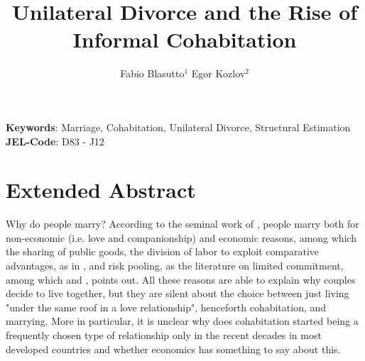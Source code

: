 \documentclass[12pt]{article}
\title{Unilateral Divorce and the Rise of Informal Cohabitation}
\author{Fabio Blasutto$^1$ \quad Egor Kozlov$^2$}
\numberwithin{table}{section}
\begin{document}
	
	
	\maketitle
	

	
	
\textbf{Keywords}: Marriage, Cohabitation, Unilateral Divorce, Structural Estimation\\
\textbf{JEL-Code}: D83 - J12
	
\section{Extended Abstract}
Why do people marry? According to the seminal work of \citet{becker1981}, people marry both for non-economic (i.e. love and companionship) and economic reasons, among which the sharing of public goods, the division of labor to exploit comparative advantages, as in \cite{chiappori1997}, and risk pooling, as the literature on limited commitment, among which \cite{voena2015} and \cite{rigas2015}, points out.
All these reasons are able to explain why couples decide to live together, but they are silent about the choice between just living "under the same roof in a love relationship", henceforth cohabitation, and marrying. More in particular, it is unclear why does cohabitation started being a frequently chosen type of relationship only in the recent decades in most developed countries and whether economics has something to say about this.
\end{document}
